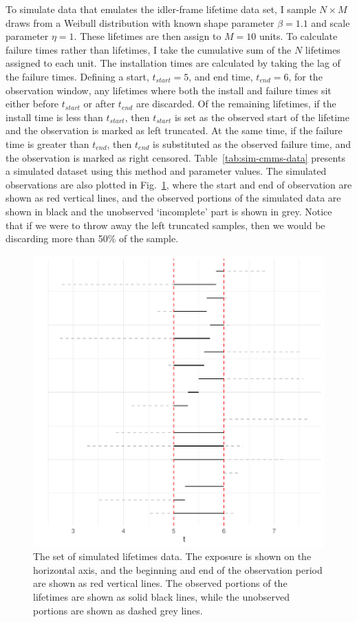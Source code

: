 To simulate data that emulates the idler-frame lifetime data set, I sample $N \times M$ draws from a Weibull distribution with known shape parameter $\beta = 1.1$ and scale parameter $\eta = 1$. These lifetimes are then assign to $M = 10$ units. To calculate failure times rather than lifetimes, I take the cumulative sum of the $N$ lifetimes assigned to each unit. The installation times are calculated by taking the lag of the failure times. Defining a start, $t_{start} = 5$, and end time, $t_{end} = 6$, for the observation window, any lifetimes where both the install and failure times sit either before $t_{start}$ or after $t_{end}$ are discarded. Of the remaining lifetimes, if the install time is less than $t_{start}$, then $t_{start}$ is set as the observed start of the lifetime and the observation is marked as left truncated. At the same time, if the failure time is greater than $t_{end}$, then $t_{end}$ is substituted as the observed failure time, and the observation is marked as right censored. Table~\ref{tab:sim-cmms-data} presents a simulated dataset using this method and parameter values. The simulated observations are also plotted in Fig.~\ref{fig:sim_censored_units}, where the start and end of observation are shown as red vertical lines, and the observed portions of the simulated data are shown in black and the unobserved `incomplete' part is shown in grey. Notice that if we were to throw away the left truncated samples, then we would be discarding more than 50\% of the sample.

\begin{figure}
    \centering
    \includegraphics[width=1\textwidth]{./figures/ch-2/sim-data.pdf}
    \caption{The set of simulated lifetimes data. The exposure is shown on the horizontal axis, and the beginning and end of the observation period are shown as red vertical lines. The observed portions of the lifetimes are shown as solid black lines, while the unobserved portions are shown as dashed grey lines.}
    \label{fig:sim_censored_units}
\end{figure}

